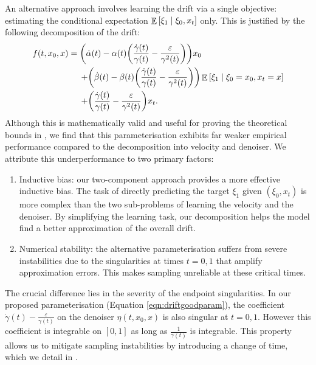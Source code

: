 An alternative approach involves learning the drift via a single objective: estimating the conditional expectation \(\mathop{\mathbb{E}}\qty[\xi_{1} \mid \xi_{0}, x_{t}]\) only. This is justified by the following decomposition of the drift:
\begin{align}
  f(t, x_{0}, x) &=  \qty(\dot{\alpha}(t) - \alpha(t)\qty(\frac{\dot{\gamma}(t)}{\gamma(t)} - \frac{\varepsilon}{\gamma^{2}(t)})) x_{0} \notag\\
  &\mathrel{\phantom{=}}\, + \qty(\dot{\beta}(t) - \beta(t)\qty(\frac{\dot{\gamma}(t)}{\gamma(t)} - \frac{\varepsilon}{\gamma^{2}(t)})) \mathop{\mathbb{E}}\qty[\xi_{1} \mid \xi_{0} = x_{0}, x_{t} = x]\notag \\
  &\mathrel{\phantom{=}}\, + \qty(\frac{\dot{\gamma}(t)}{\gamma(t)} - \frac{\varepsilon}{\gamma^{2}(t)}) x_{t}. \label{eqn:driftbadparam}
\end{align}
Although this is mathematically valid and useful for proving the theoretical bounds in , we find that this parameterisation exhibits far weaker empirical performance compared to the decomposition into velocity and denoiser. We attribute this underperformance to two primary factors:
\begin{enumerate}
  \item Inductive bias: our two-component approach provides a more effective inductive bias. The task of directly predicting the target \(\xi_{1}\) given \((\xi_{0}, x_{t})\) is more complex than the two sub-problems of learning the velocity and the denoiser. By simplifying the learning task, our decomposition helps the model find a better approximation of the overall drift.
  \item Numerical stability: the alternative parameterisation suffers from severe instabilities due to the singularities at times \(t = 0 ,1\) that amplify approximation errors. This makes sampling unreliable at these critical times.
\end{enumerate}

The crucial difference lies in the severity of the endpoint singularities. In our proposed parameterisation (Equation \ref{eqn:driftgoodparam}),  the coefficient \(\dot{\gamma}(t) - \frac{\varepsilon}{\gamma(t)}\) on the denoiser \(\eta(t, x_{0}, x)\) is also singular at \(t = 0, 1\). However this coefficient is integrable on \([0, 1]\) as long as \(\frac{1}{\gamma(t)}\) is integrable. This property allows us to mitigate sampling instabilities by introducing a change of time, which we detail in .

